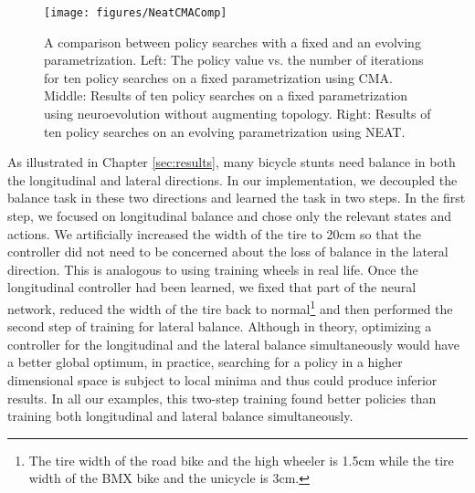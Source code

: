 \begin{figure}[ht]
  \centering
  \texttt{[image: figures/NeatCMAComp]}
  \caption{A comparison between policy searches with a fixed and an evolving parametrization. Left: The policy value vs. the number of iterations for ten policy searches on a fixed parametrization using CMA. Middle: Results of ten policy searches on a fixed parametrization using neuroevolution without augmenting topology. Right: Results of ten policy searches on an evolving parametrization using NEAT. }
  \label{fig:compare}
\end{figure}

As illustrated in Chapter \ref{sec:results}, many bicycle stunts need balance in both the longitudinal and lateral directions. In our implementation, we decoupled the balance task in these two directions and learned the task in two steps. In the first step, we focused on longitudinal balance and chose only the relevant states and actions. We artificially increased the width of the tire to 20cm so that the controller did not need to be concerned about the loss of balance in the lateral direction. This is analogous to using training wheels in real life. Once the longitudinal controller had been learned, we fixed that part of the neural network, reduced the width of the tire back to normal\footnote{The tire width of the road bike and the high wheeler is 1.5cm while the tire width of the BMX bike and the unicycle is 3cm.} and then performed the second step of training for lateral balance. Although in theory, optimizing a controller for the longitudinal and the lateral balance simultaneously would have a better global optimum, in practice, searching for a policy in a higher dimensional space is subject to local minima and thus could produce inferior results. In all our examples, this two-step training found better policies than training both longitudinal and lateral balance simultaneously.


